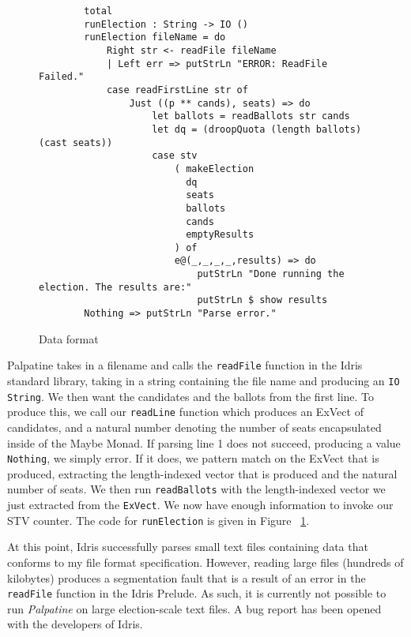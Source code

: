 \begin{figure}[ht!!!!!!!]
    \caption{Data format}
    \label{main_code}
    \begin{lstlisting}
        total
        runElection : String -> IO ()
        runElection fileName = do
            Right str <- readFile fileName
            | Left err => putStrLn "ERROR: ReadFile Failed."
            case readFirstLine str of
                Just ((p ** cands), seats) => do 
                    let ballots = readBallots str cands
                    let dq = (droopQuota (length ballots) (cast seats))
                    case stv
                        ( makeElection 
                          dq
                          seats
                          ballots
                          cands
                          emptyResults
                        ) of
                        e@(_,_,_,_,results) => do
                            putStrLn "Done running the election. The results are:"
                            putStrLn $ show results
        Nothing => putStrLn "Parse error."
    \end{lstlisting}
\end{figure}

Palpatine takes in a filename and calls the \texttt{readFile} function in the
Idris standard library, taking in a string containing the file name and
producing an \texttt{IO String}. We then want the candidates and the ballots
from the first line. To produce this, we call our \texttt{readLine} function
which produces an ExVect of candidates, and a natural number denoting the number
of seats encapsulated inside of the Maybe Monad. If parsing line 1 does not
succeed, producing a value \texttt{Nothing}, we simply error. If it does, we
pattern match on the ExVect that is produced, extracting the length-indexed
vector that is produced and the natural number of seats. We then run
\texttt{readBallots} with the length-indexed vector we just extracted from the
\texttt{ExVect}. We now have enough information to invoke our STV counter. The
code for \texttt{runElection} is given in Figure ~\ref{main_code}. 

At this point, Idris successfully parses small text files containing data that
conforms to my file format specification. However, reading large files (hundreds
of kilobytes) produces a segmentation fault that is a result of an error in the
\texttt{readFile} function in the Idris Prelude. As such, it is currently not
possible to run \textit{Palpatine} on large election-scale text files. A bug
report has been opened with the developers of Idris. 